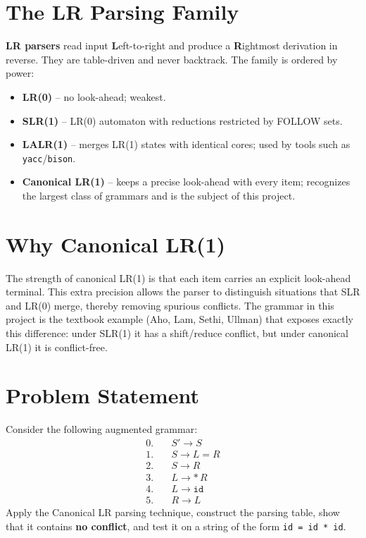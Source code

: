 \documentclass[11pt,a4paper]{report}
\begin{document}
\section{The LR Parsing Family}
\textbf{LR parsers} read input \textbf{L}eft-to-right and produce a
\textbf{R}ightmost derivation in reverse. They are table-driven and never
backtrack. The family is ordered by power:
\begin{itemize}
  \item \textbf{LR(0)} -- no look-ahead; weakest.
  \item \textbf{SLR(1)} -- LR(0) automaton with reductions restricted by FOLLOW sets.
  \item \textbf{LALR(1)} -- merges LR(1) states with identical cores; used by tools such as \texttt{yacc}/\texttt{bison}.
  \item \textbf{Canonical LR(1)} -- keeps a precise look-ahead with every item; recognizes the largest class of grammars and is the subject of this project.
\end{itemize}

\section{Why Canonical LR(1)}
The strength of canonical LR(1) is that each item carries an explicit
look-ahead terminal. This extra precision allows the parser to distinguish
situations that SLR and LR(0) merge, thereby removing spurious conflicts. The
grammar in this project is the textbook example (Aho, Lam, Sethi, Ullman) that
exposes exactly this difference: under SLR(1) it has a shift/reduce conflict,
but under canonical LR(1) it is conflict-free.

\section{Problem Statement}
Consider the following augmented grammar:
\begin{align*}
0.\quad & S' \rightarrow S \\
1.\quad & S \rightarrow L = R \\
2.\quad & S \rightarrow R \\
3.\quad & L \rightarrow {*}\,R \\
4.\quad & L \rightarrow \texttt{id} \\
5.\quad & R \rightarrow L
\end{align*}
Apply the Canonical LR parsing technique, construct the parsing table, show
that it contains \textbf{no conflict}, and test it on a string of the form
\texttt{id = id * id}.
\end{document}
